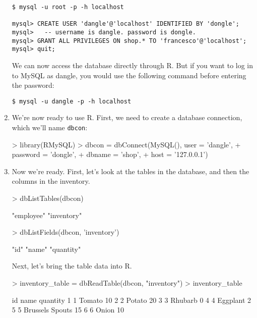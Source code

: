 \documentclass[11pt,oneside]{article}
\begin{document}
\begin{enumerate}
\begin{verbatim}
$ mysql -u root -p -h localhost

mysql> CREATE USER 'dangle'@'localhost' IDENTIFIED BY 'dongle'; 
mysql>   -- username is dangle. password is dongle.
mysql> GRANT ALL PRIVILEGES ON shop.* TO 'francesco'@'localhost';
mysql> quit;
\end{verbatim}


We can now access the database directly through R. But if you want to log in to MySQL as dangle, you would use the following command before entering the password:

\begin{verbatim}
$ mysql -u dangle -p -h localhost
\end{verbatim}



\item We're now ready to use R. First, we need to create a database connection, which we'll name \texttt{dbcon}:

\begin{Schunk}
\begin{Sinput}
> library(RMySQL)
> dbcon = dbConnect(MySQL(), user = 'dangle', 
+                  password = 'dongle', 
+                  dbname = 'shop', 
+                  host = '127.0.0.1')
\end{Sinput}
\end{Schunk}



\item Now we're ready. First, let's look at the tables in the database, and then the columns in the inventory.

\begin{Schunk}
\begin{Sinput}
> dbListTables(dbcon)
\end{Sinput}
\begin{Soutput}
[1] "employee"  "inventory"
\end{Soutput}
\begin{Sinput}
> dbListFields(dbcon, 'inventory')
\end{Sinput}
\begin{Soutput}
[1] "id"       "name"     "quantity"
\end{Soutput}
\end{Schunk}


\vspace{25 pt}
Next, let's bring the table data into R. 

\begin{Schunk}
\begin{Sinput}
> inventory_table = dbReadTable(dbcon, "inventory")
> inventory_table
\end{Sinput}
\begin{Soutput}
  id            name quantity
1  1          Tomato       10
2  2          Potato       20
3  3         Rhubarb        0
4  4        Eggplant        2
5  5 Brussels Spouts       15
6  6           Onion       10
\end{Soutput}
\end{Schunk}



\end{enumerate}
\end{document}
